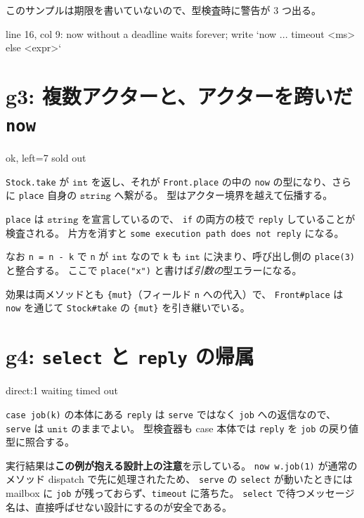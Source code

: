 \documentclass[11pt,a4paper]{ltjsarticle}
\newcommand{\ty}[1]{\ensuremath{\mathtt{#1}}}
\newcommand{\eff}[1]{\texttt{\{#1\}}}
\begin{document}
このサンプルは期限を書いていないので、型検査時に警告が 3 つ出る。

\begin{term}
[warn] line 16, col 9: now without a deadline waits forever;
  write `now ... timeout <ms> else <expr>`
\end{term}

\section{g3: 複数アクターと、アクターを跨いだ \texttt{now}}



\begin{term}
ok, left=7
sold out
\end{term}

\texttt{Stock.take} が \ty{int} を返し、それが \texttt{Front.place} の中の
\texttt{now} の型になり、さらに \texttt{place} 自身の \ty{string} へ繋がる。
型はアクター境界を越えて伝播する。

\texttt{place} は \ty{string} を宣言しているので、
\texttt{if} の両方の枝で \texttt{reply} していることが検査される。
片方を消すと \texttt{some execution path does not reply} になる。

なお \texttt{n = n - k} で \texttt{n} が \ty{int} なので \texttt{k} も
\ty{int} に決まり、呼び出し側の \texttt{place(3)} と整合する。
ここで \texttt{place("x")} と書けば\emph{引数の}型エラーになる。

効果は両メソッドとも \eff{mut}（フィールド \texttt{n} への代入）で、
\texttt{Front\#place} は \texttt{now} を通じて \texttt{Stock\#take} の
\eff{mut} を引き継いでいる。

\section{g4: \texttt{select} と \texttt{reply} の帰属}
\label{sec:g4}



\begin{term}
direct:1
waiting
timed out
\end{term}

\texttt{case job(k)} の本体にある \texttt{reply} は \texttt{serve} ではなく
\texttt{job} への返信なので、\texttt{serve} は \ty{unit} のままでよい。
型検査器も case 本体では \texttt{reply} を \texttt{job} の戻り値型に照合する。

実行結果は\textbf{この例が抱える設計上の注意}を示している。
\texttt{now w.job(1)} が通常のメソッド dispatch で先に処理されたため、
\texttt{serve} の \texttt{select} が動いたときには mailbox に
\texttt{job} が残っておらず、\texttt{timeout} に落ちた。
\texttt{select} で待つメッセージ名は、直接呼ばせない設計にするのが安全である。
\end{document}
